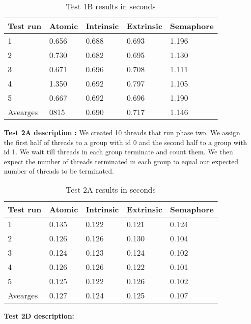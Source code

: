 \documentclass[11pt]{article}
\begin{document}
\begin{table}[H]
\centering
\caption{Test 1B results in seconds}
\label{tab:my-table}
\begin{tabular}{|l|l|l|l|l|}
\hline
Test run & Atomic & Intrinsic & Extrinsic & Semaphore \\ \hline
1        & 0.656  & 0.688     & 0.693     & 1.196     \\ \hline
2        & 0.730  & 0.682     & 0.695     & 1.130     \\ \hline
3        & 0.671  & 0.696     & 0.708     & 1.111     \\ \hline
4        & 1.350  & 0.692     & 0.797     & 1.105     \\ \hline
5        & 0.667  & 0.692     & 0.696     & 1.190     \\ \hline
Avearges & 0815   & 0.690     & 0.717     & 1.146     \\ \hline
\end{tabular}
\end{table}

\textbf{Test 2A description :} We created 10 threads that run phase two. We assign the first half of threads to a group with id 0 and the second half to a group with id 1. We wait till threads in each group terminate and count them. We then expect the number of threads terminated in each group to equal our expected number of threads to be terminated. \\


\begin{table}[H]
\centering
\caption{Test 2A results in seconds}
\label{tab:my-table}
\begin{tabular}{|l|l|l|l|l|}
\hline
Test run & Atomic & Intrinsic & Extrinsic & Semaphore \\ \hline
1        & 0.135  & 0.122     & 0.121     & 0.124     \\ \hline
2        & 0.126  & 0.126     & 0.130     & 0.104     \\ \hline
3        & 0.124  & 0.123     & 0.124     & 0.102     \\ \hline
4        & 0.126  & 0.126     & 0.122     & 0.101     \\ \hline
5        & 0.125  & 0.122     & 0.126     & 0.102     \\ \hline
Avearges & 0.127  & 0.124     & 0.125     & 0.107     \\ \hline
\end{tabular}
\end{table}

\textbf{Test 2D description:}
\\
\end{document}
